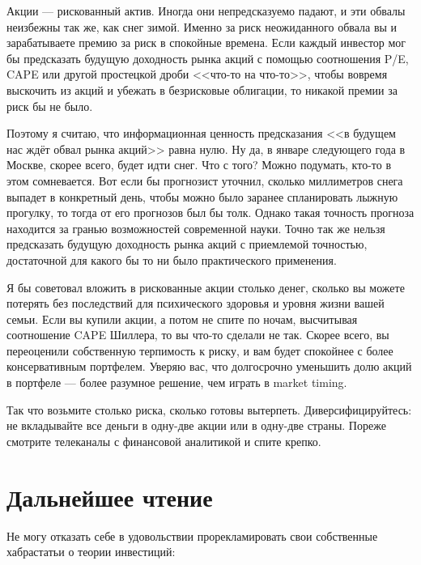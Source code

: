 Акции --- рискованный актив. Иногда они непредсказуемо падают, и эти обвалы 
неизбежны так же, как снег зимой. Именно за риск неожиданного обвала вы и 
зарабатываете премию за риск в спокойные времена. Если каждый инвестор мог бы 
предсказать будущую доходность рынка акций с помощью соотношения P/E, CAPE или 
другой простецкой дроби <<что-то на что-то>>, чтобы вовремя выскочить из акций 
и убежать в безрисковые облигации, то никакой премии за риск бы не было.

Поэтому я считаю, что информационная ценность предсказания <<в будущем нас 
ждёт обвал рынка акций>> равна нулю. Ну да, в январе следующего года в Москве, 
скорее всего, будет идти снег. Что с того? Можно подумать, кто-то в этом 
сомневается. Вот если бы прогнозист уточнил, сколько миллиметров снега выпадет 
в конкретный день, чтобы можно было заранее спланировать лыжную прогулку, то 
тогда от его прогнозов был бы толк. Однако такая точность прогноза находится 
за гранью возможностей современной науки. Точно так же нельзя предсказать 
будущую доходность рынка акций с приемлемой точностью, достаточной для какого 
бы то ни было практического применения.

Я бы советовал вложить в рискованные акции столько денег, сколько вы можете 
потерять без  последствий для психического здоровья и уровня жизни вашей 
семьи. Если вы купили акции, а потом не спите по ночам, высчитывая соотношение 
CAPE Шиллера, то вы что-то сделали не так. Скорее всего, вы переоценили 
собственную терпимость к риску, и вам будет спокойнее с более консервативным 
портфелем. Уверяю вас, что долгосрочно уменьшить долю акций в портфеле --- 
более разумное решение, чем играть в market timing.

Так что возьмите столько риска, сколько готовы вытерпеть. Диверсифицируйтесь: 
не вкладывайте все деньги в одну-две акции или в одну-две страны. Пореже 
смотрите телеканалы с финансовой аналитикой и спите крепко.

\section*{Дальнейшее чтение}

Не могу отказать себе в удовольствии прорекламировать свои собственные 
хабрастатьи о теории инвестиций:

